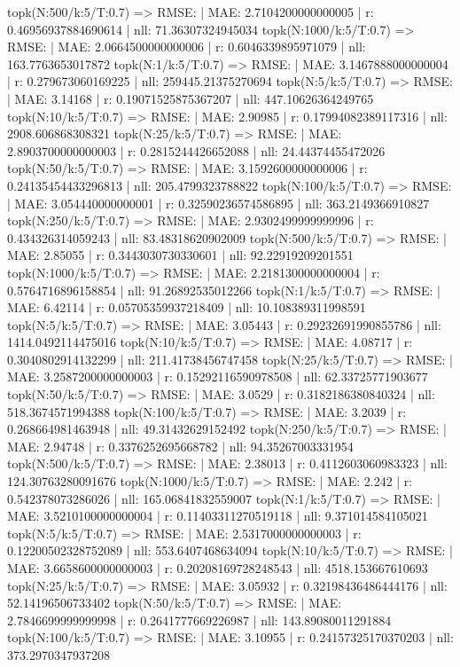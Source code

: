 topk(N:500/k:5/T:0.7) => RMSE: | MAE: 2.7104200000000005 | r: 0.46956937884690614 | nll: 71.36307324945034
topk(N:1000/k:5/T:0.7) => RMSE: | MAE: 2.0664500000000006 | r: 0.6046339895971079 | nll: 163.7763653017872
topk(N:1/k:5/T:0.7) => RMSE: | MAE: 3.1467888000000004 | r: 0.279673060169225 | nll: 259445.21375270694
topk(N:5/k:5/T:0.7) => RMSE: | MAE: 3.14168 | r: 0.19071525875367207 | nll: 447.10626364249765
topk(N:10/k:5/T:0.7) => RMSE: | MAE: 2.90985 | r: 0.17994082389117316 | nll: 2908.606868308321
topk(N:25/k:5/T:0.7) => RMSE: | MAE: 2.8903700000000003 | r: 0.2815244426652088 | nll: 24.44374455472026
topk(N:50/k:5/T:0.7) => RMSE: | MAE: 3.1592600000000006 | r: 0.24135454433296813 | nll: 205.4799323788822
topk(N:100/k:5/T:0.7) => RMSE: | MAE: 3.054440000000001 | r: 0.32590236574586895 | nll: 363.2149366910827
topk(N:250/k:5/T:0.7) => RMSE: | MAE: 2.9302499999999996 | r: 0.434326314059243 | nll: 83.48318620902009
topk(N:500/k:5/T:0.7) => RMSE: | MAE: 2.85055 | r: 0.3443030730330601 | nll: 92.22919209201551
topk(N:1000/k:5/T:0.7) => RMSE: | MAE: 2.2181300000000004 | r: 0.5764716896158854 | nll: 91.26892535012266
topk(N:1/k:5/T:0.7) => RMSE: | MAE: 6.42114 | r: 0.05705359937218409 | nll: 10.108389311998591
topk(N:5/k:5/T:0.7) => RMSE: | MAE: 3.05443 | r: 0.29232691990855786 | nll: 1414.0492114475016
topk(N:10/k:5/T:0.7) => RMSE: | MAE: 4.08717 | r: 0.3040802914132299 | nll: 211.41738456747458
topk(N:25/k:5/T:0.7) => RMSE: | MAE: 3.2587200000000003 | r: 0.15292116590978508 | nll: 62.33725771903677
topk(N:50/k:5/T:0.7) => RMSE: | MAE: 3.0529 | r: 0.3182186380840324 | nll: 518.3674571994388
topk(N:100/k:5/T:0.7) => RMSE: | MAE: 3.2039 | r: 0.268664981463948 | nll: 49.31432629152492
topk(N:250/k:5/T:0.7) => RMSE: | MAE: 2.94748 | r: 0.3376252695668782 | nll: 94.35267003331954
topk(N:500/k:5/T:0.7) => RMSE: | MAE: 2.38013 | r: 0.4112603060983323 | nll: 124.30763280091676
topk(N:1000/k:5/T:0.7) => RMSE: | MAE: 2.242 | r: 0.542378073286026 | nll: 165.06841832559007
topk(N:1/k:5/T:0.7) => RMSE: | MAE: 3.5210100000000004 | r: 0.11403311270519118 | nll: 9.371014584105021
topk(N:5/k:5/T:0.7) => RMSE: | MAE: 2.5317000000000003 | r: 0.12200502328752089 | nll: 553.6407468634094
topk(N:10/k:5/T:0.7) => RMSE: | MAE: 3.6658600000000003 | r: 0.20208169728248543 | nll: 4518.153667610693
topk(N:25/k:5/T:0.7) => RMSE: | MAE: 3.05932 | r: 0.32198436486444176 | nll: 52.14196506733402
topk(N:50/k:5/T:0.7) => RMSE: | MAE: 2.7846699999999998 | r: 0.2641777669226987 | nll: 143.89080011291884
topk(N:100/k:5/T:0.7) => RMSE: | MAE: 3.10955 | r: 0.24157325170370203 | nll: 373.2970347937208
